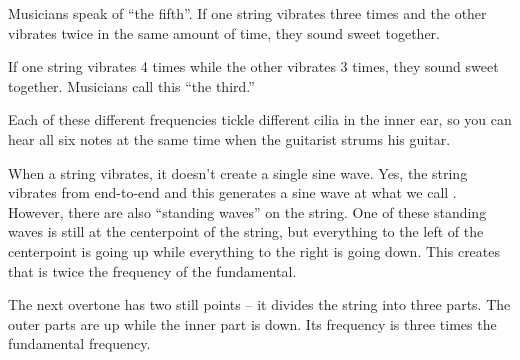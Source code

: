Musicians speak of ``the fifth''.  If one string vibrates three times
and the other vibrates twice in the same amount of time, they sound
sweet together.

If one string vibrates 4 times while the other vibrates 3 times, they
sound sweet together. Musicians call this ``the third.''

Each of these different frequencies tickle different cilia in the
inner ear, so you can hear all six notes at the same time when
the guitarist strums his guitar.

When a string vibrates, it doesn't create a single sine wave. Yes, the
string vibrates from end-to-end and this generates a sine wave at what
we call . However, there are also
``standing waves'' on the string. One of these standing waves is
still at the centerpoint of the string, but everything to the left of
the centerpoint is going up while everything to the right is going
down. This creates  that is twice the frequency
of the fundamental.


The next overtone has two still points -- it divides the string into
three parts.  The outer parts are up while the inner part is
down. Its frequency is three times the fundamental frequency.


